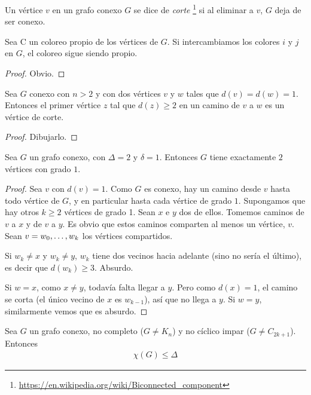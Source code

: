 \begin{definition}
Un vértice $v$ en un grafo conexo $G$ se dice de \emph{corte} \footnote{\url{https://en.wikipedia.org/wiki/Biconnected_component}} si al eliminar a $v$, $G$ deja de ser conexo.
\end{definition}

\begin{lemma}\label{lema1}
Sea C un coloreo propio de los vértices de $G$. Si intercambiamos los colores $i$ y $j$ en $G$, el coloreo sigue siendo propio.
\end{lemma}
\begin{proof}
Obvio.
\end{proof}

\begin{lemma}\label{graph_cut_lemma}
Sea $G$ conexo con $n > 2$ y con dos vértices $v$ y $w$ tales que $d(v) = d(w) = 1$. Entonces el primer vértice $z$ tal que $d(z) \ge 2$ en un camino de $v$ a $w$ es un vértice de corte.
\end{lemma}
\begin{proof}
Dibujarlo.
\end{proof}

\begin{lemma}\label{G is chain}
Sea $G$ un grafo conexo, con $\Delta = 2$ y $\delta = 1$. Entonces $G$ tiene exactamente $2$ vértices con grado $1$.
\end{lemma}
\begin{proof}
Sea $v$ con $d(v) = 1$. Como $G$ es conexo, hay un camino desde $v$ hasta todo vértice de $G$, y en particular hasta cada vértice de grado $1$.
Supongamos que hay otros $k \ge 2$ vértices de grado 1. Sean $x$ e $y$ dos de ellos. Tomemos caminos de $v$ a $x$ y de $v$ a $y$. Es obvio que estos caminos comparten al menos un vértice, $v$. Sean $v = w_0, \mathellipsis, w_k$ los vértices compartidos.

Si $w_k \neq x$ y $w_k \neq y$, $w_k$ tiene dos vecinos hacia adelante (sino no sería el último), es decir que $d(w_k) \ge 3$. Absurdo.

Si $w = x$, como $x \neq y$, todavía falta llegar a $y$. Pero como $d(x) = 1$, el camino se corta (el único vecino de $x$ es $w_{k-1}$), así que no llega a $y$. Si $w = y$, similarmente vemos que es absurdo.
\end{proof}

\begin{theorem}
Sea $G$ un grafo conexo, no completo ($G \neq K_n$) y no cíclico impar ($G \neq C_{2k+1}$). Entonces
\begin{align}
    \chi(G) \le \Delta
\end{align}
\end{theorem}

